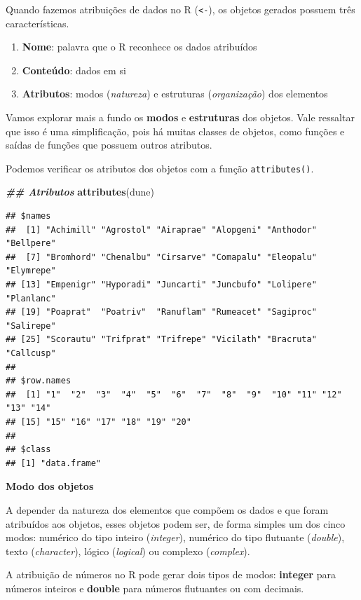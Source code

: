 \documentclass[
]{article}
\newenvironment{Shaded}{\begin{snugshade}}{\end{snugshade}}
\newcommand{\DocumentationTok}[1]{\textcolor[rgb]{0.56,0.35,0.01}{\textbf{\textit{#1}}}}
\newcommand{\FunctionTok}[1]{\textcolor[rgb]{0.13,0.29,0.53}{\textbf{#1}}}
\newcommand{\NormalTok}[1]{#1}
\providecommand{\tightlist}{%
  \setlength{\itemsep}{0pt}\setlength{\parskip}{0pt}}
\begin{document}
Quando fazemos atribuições de dados no R (\texttt{\textless{}-}), os objetos gerados possuem três características.

\begin{enumerate}
\def\labelenumi{\arabic{enumi}.}
\tightlist
\item
  \textbf{Nome}: palavra que o R reconhece os dados atribuídos
\item
  \textbf{Conteúdo}: dados em si
\item
  \textbf{Atributos}: modos (\emph{natureza}) e estruturas (\emph{organização}) dos elementos
\end{enumerate}

Vamos explorar mais a fundo os \textbf{modos} e \textbf{estruturas} dos objetos. Vale ressaltar que isso é uma simplificação, pois há muitas classes de objetos, como funções e saídas de funções que possuem outros atributos.

Podemos verificar os atributos dos objetos com a função \texttt{attributes()}.

\begin{Shaded}
\begin{Highlighting}[]
\DocumentationTok{\#\# Atributos}
\FunctionTok{attributes}\NormalTok{(dune)}
\end{Highlighting}
\end{Shaded}

\begin{verbatim}
## $names
##  [1] "Achimill" "Agrostol" "Airaprae" "Alopgeni" "Anthodor" "Bellpere"
##  [7] "Bromhord" "Chenalbu" "Cirsarve" "Comapalu" "Eleopalu" "Elymrepe"
## [13] "Empenigr" "Hyporadi" "Juncarti" "Juncbufo" "Lolipere" "Planlanc"
## [19] "Poaprat"  "Poatriv"  "Ranuflam" "Rumeacet" "Sagiproc" "Salirepe"
## [25] "Scorautu" "Trifprat" "Trifrepe" "Vicilath" "Bracruta" "Callcusp"
## 
## $row.names
##  [1] "1"  "2"  "3"  "4"  "5"  "6"  "7"  "8"  "9"  "10" "11" "12" "13" "14"
## [15] "15" "16" "17" "18" "19" "20"
## 
## $class
## [1] "data.frame"
\end{verbatim}

\textbf{Modo dos objetos}

A depender da natureza dos elementos que compõem os dados e que foram atribuídos aos objetos, esses objetos podem ser, de forma simples um dos cinco modos: numérico do tipo inteiro (\emph{integer}), numérico do tipo flutuante (\emph{double}), texto (\emph{character}), lógico (\emph{logical}) ou complexo (\emph{complex}).

A atribuição de números no R pode gerar dois tipos de modos: \textbf{integer} para números inteiros e \textbf{double} para números flutuantes ou com decimais.
\end{document}

